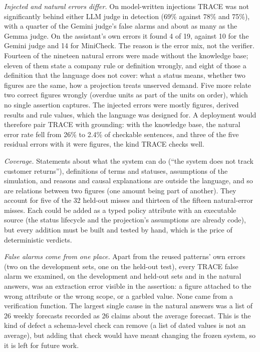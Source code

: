 \documentclass[journal]{IEEEtran}
\renewcommand{\paragraph}[1]{\par\textit{#1}\enspace}
\begin{document}
\paragraph{Injected and natural errors differ.} On model-written injections TRACE was not significantly behind
either LLM judge in detection (69\% against 78\% and 75\%), with a quarter of the Gemini judge's false
alarms and about as many as the Gemma judge. On the
assistant's own errors it found 4 of 19, against 10 for the Gemini judge and 14 for MiniCheck. The reason is the error mix, not the
verifier. Fourteen of the nineteen natural errors were made without the knowledge base; eleven of them state a
company rule or definition wrongly, and eight of those a definition that the language does not cover: what a
status means, whether two figures are the same, how a projection treats unserved demand. Five more relate two
correct figures wrongly (overdue units as part of the units on order), which no single assertion captures. The injected errors
were mostly figures, derived results and rule values, which the language was designed for. A deployment would therefore pair TRACE with grounding: with the knowledge base, the
natural error rate fell from 26\% to 2.4\% of checkable sentences, and three of the five residual errors
with it were figures, the kind TRACE checks well.

\paragraph{Coverage.} Statements about what the system can do (``the system does not track customer
returns''), definitions of terms and statuses, assumptions of the simulation, and reasons and causal
explanations are outside the language, and so are relations between two figures (one amount being part of
another). They account for five of the 32 held-out misses and thirteen of the fifteen natural-error misses. Each could be added as a typed policy attribute with an executable source (the
status lifecycle and the projection's assumptions are already code), but every addition must be built and
tested by hand, which is the price of deterministic verdicts.

\paragraph{False alarms come from one place.} Apart from the reused patterns' own errors (two on the
development sets, one on the held-out test), every TRACE false alarm we examined, on the development and
held-out sets and in the natural answers, was an extraction error visible in the assertion: a figure attached
to the wrong attribute or the wrong scope, or a garbled value. None came from a verification function. The
largest single cause in the natural answers was a list of 26 weekly forecasts recorded as 26 claims about
the average forecast. This is the kind of defect a schema-level check can remove (a list of dated values is
not an average), but adding that check would have meant changing the frozen system, so it is left for future
work.
\end{document}
